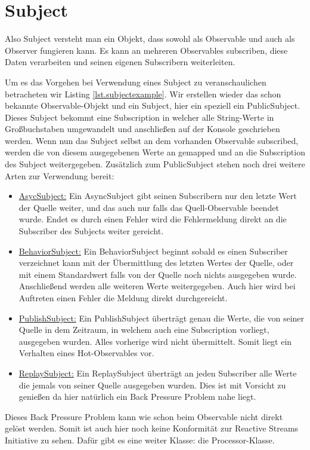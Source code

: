 \section{Subject}
Also Subject versteht man ein Objekt, dass sowohl als Observable und auch als Observer fungieren kann. Es kann an mehreren Observables subscriben, diese Daten verarbeiten und seinen eigenen Subscribern weiterleiten. 

Um es das Vorgehen bei Verwendung eines Subject zu veranschaulichen betracheten wir Listing \ref{lst.subjectexample}. Wir erstellen wieder das schon bekannte Observable-Objekt und ein Subject, hier ein speziell ein PublicSubject. Dieses Subject bekommt eine Subscription in welcher alle String-Werte in Großbuchstaben umgewandelt und anschließen auf der Konsole geschrieben werden. Wenn nun das Subject selbst an dem vorhanden Observable subscribed, werden die von diesem ausgegebenen Werte an gemapped und an die Subscription des Subject weitergegeben. Zusätzlich zum PublicSubject stehen noch drei weitere Arten zur Verwendung bereit:
\begin{itemize}
	\item \underline{AsycSubject:} Ein AsyncSubject gibt seinen Subscribern nur den letzte Wert der Quelle weiter, und das auch nur falls das Quell-Observable beendet wurde. Endet es durch einen Fehler wird die Fehlermeldung direkt an die Subscriber des Subjects weiter gereicht.
	\item \underline{BehaviorSubject:} Ein BehaviorSubject beginnt sobald es einen Subscriber verzeichnet kann mit der Übermittlung des letzten Wertes der Quelle, oder mit einem Standardwert falls von der Quelle noch nichts ausgegeben wurde. Anschließend werden alle weiteren Werte weitergegeben. Auch hier wird bei Auftreten einen Fehler die Meldung direkt durchgereicht.
	\item \underline{PublishSubject:} Ein PublishSubject überträgt genau die Werte, die von seiner Quelle in dem Zeitraum, in welchem auch eine Subscription vorliegt, ausgegeben wurden. Alles vorherige wird nicht übermittelt. Somit liegt ein Verhalten eines Hot-Observables vor.
	\item \underline{ReplaySubject:} Ein ReplaySubject überträgt an jeden Subscriber alle Werte die jemals von seiner Quelle ausgegeben wurden. Dies ist mit Vorsicht zu genießen da hier natürlich ein Back Pressure Problem nahe liegt. 
\end{itemize}
Dieses Back Pressure Problem kann wie schon beim Observable nicht direkt gelöst werden. Somit ist auch hier noch keine Konformität zur Reactive Streams Initiative zu sehen. Dafür gibt es eine weiter Klasse: die Processor-Klasse.
